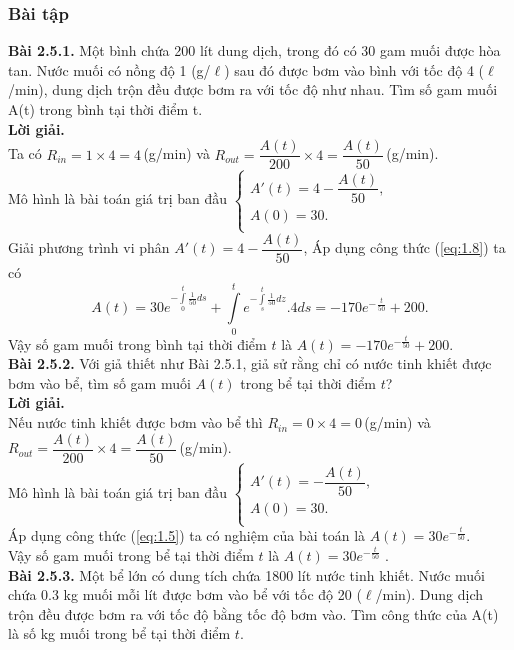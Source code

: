 \subsubsection{Bài tập}
\noindent\textbf{Bài 2.5.1.}  Một bình chứa 200 lít dung dịch, trong đó có 30 gam muối được hòa tan. Nước muối có nồng độ 1 (g/$\ell$) sau đó được bơm vào bình với tốc độ 4 ($\ell$/min), dung dịch trộn đều được bơm ra với tốc độ như nhau. Tìm số gam muối A(t) trong bình tại thời điểm t.\\
\textbf{Lời giải. }\\
Ta có ${{R}_{in}}=1\times 4=4\,$(g/min) và ${{R}_{out}}=\dfrac{A(t)}{200}\times 4=\dfrac{A(t)}{50}\,$(g/min).\\
Mô hình là bài toán giá trị ban đầu  $\left\{ \begin{array}{l}
	 {A}'(t)=4-\dfrac{A(t)}{50}, \\ 
	 A(0)=30. \\ 
\end{array} \right.$\\
Giải phương trình vi phân ${A}'(t)=4-\dfrac{A(t)}{50}$, Áp dụng công thức (\ref{eq:1.8}) ta có
$$A(t)=30{{e}^{-\int\limits_{0}^{t}{\frac{1}{50}ds}}}+\int\limits_{0}^{t}{{{e}^{-\int\limits_{s}^{t}{\frac{1}{50}dz}}}.4}ds=-170{{e}^{-}}^{\frac{t}{50}}+200.$$
Vậy số gam muối trong bình tại thời điểm $t$ là $A(t)=-170{{e}^{-\frac{t}{50}}}+200$.\\
\textbf{Bài 2.5.2.} Với giả thiết như Bài 2.5.1,  giả sử rằng chỉ có nước tinh khiết được bơm vào bể, tìm số gam muối $A(t)$ trong bể tại thời điểm $t$?\\
\textbf{Lời giải.}\\
Nếu nước tinh khiết được bơm vào bể thì 
${{R}_{in}}=0\times 4=0\,$(g/min) \newline và ${{R}_{out}}=\dfrac{A(t)}{200}\times 4=\dfrac{A(t)}{50}\,$(g/min).\\
Mô hình là bài toán giá trị ban đầu  $\left\{ \begin{array}{l}
	 {A}'(t)=-\dfrac{A(t)}{50}, \\ 
	 A(0)=30. \\ 
\end{array} \right.$\\
Áp dụng công thức (\ref{eq:1.5}) ta có nghiệm của bài toán là $A(t)=30{{e}^{-\frac{t}{50}}}$.\\
Vậy số gam muối trong bể tại thời điểm $t$ là $A(t)=30{{e}^{-\frac{t}{50}}}$ .\\
\textbf{Bài 2.5.3.} Một bể lớn có dung tích chứa 1800 lít nước tinh khiết. Nước muối chứa 0.3 kg muối mỗi lít được bơm vào bể với tốc độ 20 ($\ell$/min). Dung dịch trộn đều được bơm ra với tốc độ bằng tốc độ bơm vào. Tìm công thức của A(t) là số kg muối trong bể tại thời điểm $t$.\\
